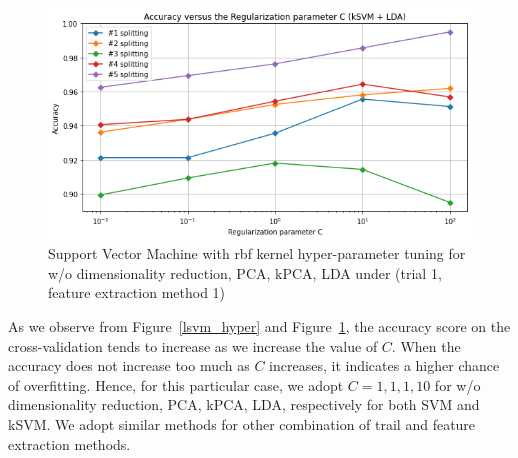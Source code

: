 \documentclass{article}
\begin{document}
\begin{figure}[!htb]
  \includegraphics[width=\linewidth]{figure/ksvm_lda.png}
\endminipage
\caption{Support Vector Machine with rbf kernel hyper-parameter tuning for w/o dimensionality reduction, PCA, kPCA, LDA under (trial 1, feature extraction method 1)}
\label{ksvm_hyper}
\end{figure}

As we observe from Figure~\ref{lsvm_hyper} and Figure~\ref{ksvm_hyper}, the accuracy score on the cross-validation tends to increase as we increase the value of $C$. When the accuracy does not increase too much as $C$ increases, it indicates a higher chance of overfitting. Hence, for this particular case, we adopt $C = 1, 1, 1, 10$ for  w/o dimensionality reduction, PCA, kPCA, LDA, respectively for both SVM and kSVM. We adopt similar methods for other combination of trail and feature extraction methods.
\end{document}

